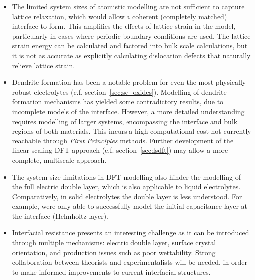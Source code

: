 \documentclass[../main.tex]{subfiles}
\begin{document}
\begin{itemize}
    \item The limited system sizes of atomistic modelling are not sufficient to capture lattice relaxation, which would allow a coherent (completely matched) interface to form. This amplifies the effects of lattice strain in the model, particularly in cases where periodic boundary conditions are used.\cite{Lepley2015} The lattice strain energy can be calculated and factored into bulk scale calculations, but it is not as accurate as explicitly calculating dislocation defects that naturally relieve lattice strain.\cite{Rodney2017, Clouet2020}
    \item Dendrite formation has been a notable problem for even the most physically robust electrolytes (c.f. section~\ref{sec:se_oxides}). Modelling of dendrite formation mechanisms has yielded some contradictory results, due to incomplete models of the interface.\cite{Tian2018, Gao2020, Canepa2018} However, a more detailed understanding requires modelling of larger systems, encompassing the interface and bulk regions of both materials. This incurs a high computational cost not currently reachable through \textit{First Principles} methods. Further development of the linear-scaling DFT approach (c.f. section~\ref{sec:lsdft}) may allow a more complete, multiscale approach.
    \item The system size limitations in DFT modelling also hinder the modelling of the full electric double layer, which is also applicable to liquid electrolytes. Comparatively, in solid electrolytes the double layer is less understood. For example, \citeauthor{Tateyama2019} were only able to successfully model the initial capacitance layer at the interface (Helmholtz layer).\cite{Tateyama2019}
    \item Interfacial resistance presents an interesting challenge as it can be introduced through multiple mechanisms\cite{Jiang2019}: electric double layer,\cite{Tateyama2019} surface crystal orientation,\cite{Okuno2020} and production issues such as poor wettability.\cite{Sharafi2017} Strong collaboration between theorists and experimentalists will be needed, in order to make informed improvements to current interfacial structures.
\end{itemize}
\end{document}
